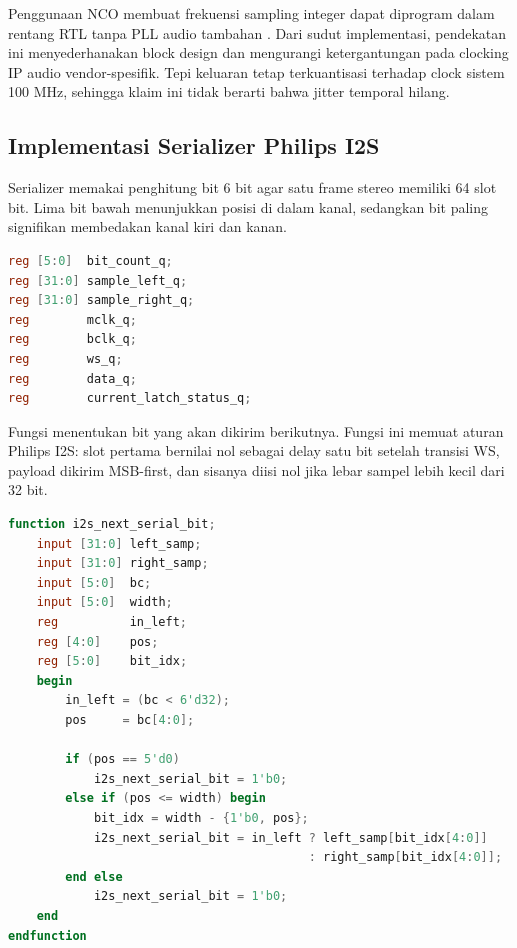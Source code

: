 Penggunaan NCO membuat frekuensi sampling integer dapat diprogram dalam rentang RTL tanpa PLL audio tambahan \citep{ao2012nco}. Dari sudut implementasi, pendekatan ini menyederhanakan block design dan mengurangi ketergantungan pada clocking IP audio vendor-spesifik. Tepi keluaran tetap terkuantisasi terhadap clock sistem 100 MHz, sehingga klaim ini tidak berarti bahwa jitter temporal hilang.

\subsection{Implementasi Serializer Philips I2S}

Serializer memakai penghitung bit 6 bit agar satu frame stereo memiliki 64 slot bit. Lima bit bawah menunjukkan posisi di dalam kanal, sedangkan bit paling signifikan membedakan kanal kiri dan kanan.

\begin{lstlisting}[language=Verilog,caption={Register state utama serializer I2S.},label={lst:ch4-serializer-state}]
reg [5:0]  bit_count_q;
reg [31:0] sample_left_q;
reg [31:0] sample_right_q;
reg        mclk_q;
reg        bclk_q;
reg        ws_q;
reg        data_q;
reg        current_latch_status_q;
\end{lstlisting}

Fungsi  menentukan bit yang akan dikirim berikutnya. Fungsi ini memuat aturan Philips I2S: slot pertama bernilai nol sebagai delay satu bit setelah transisi WS, payload dikirim MSB-first, dan sisanya diisi nol jika lebar sampel lebih kecil dari 32 bit.

\begin{lstlisting}[language=Verilog,caption={Fungsi pembentuk bit serial Philips I2S.},label={lst:ch4-next-bit}]
function i2s_next_serial_bit;
    input [31:0] left_samp;
    input [31:0] right_samp;
    input [5:0]  bc;
    input [5:0]  width;
    reg          in_left;
    reg [4:0]    pos;
    reg [5:0]    bit_idx;
    begin
        in_left = (bc < 6'd32);
        pos     = bc[4:0];

        if (pos == 5'd0)
            i2s_next_serial_bit = 1'b0;
        else if (pos <= width) begin
            bit_idx = width - {1'b0, pos};
            i2s_next_serial_bit = in_left ? left_samp[bit_idx[4:0]]
                                          : right_samp[bit_idx[4:0]];
        end else
            i2s_next_serial_bit = 1'b0;
    end
endfunction
\end{lstlisting}

